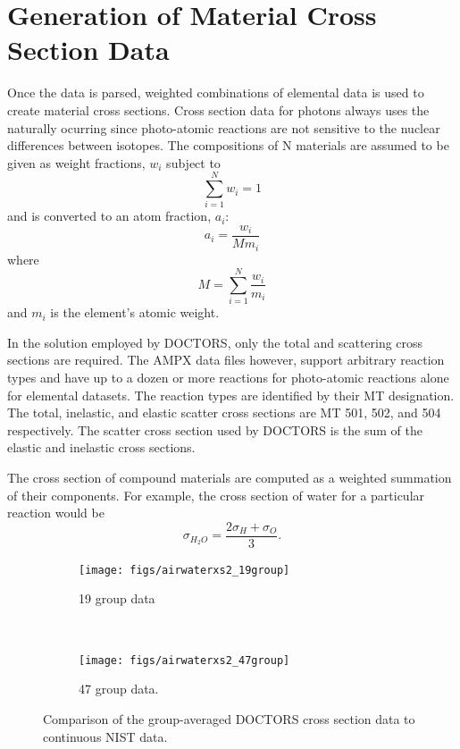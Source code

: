 \section{Generation of Material Cross Section Data}\label{sec:xsgen}

Once the data is parsed, weighted combinations of elemental data is used to create material cross sections. Cross section data for photons always uses the naturally ocurring since photo-atomic reactions are not sensitive to the nuclear differences between isotopes. The compositions of N materials are assumed to be given as weight fractions, $w_i$ subject to
\begin{equation}
\sum_{i = 1}^N w_i = 1
\end{equation}
and is converted to an atom fraction, $a_i$:
\begin{equation}
a_i = \frac{w_i}{M m_i}
\end{equation}
where
\begin{equation}
M = \sum_{i = 1}^N \frac{w_i}{m_i}
\end{equation}
and $m_i$ is the element's atomic weight.

In the solution employed by DOCTORS, only the total and scattering cross sections are required. The AMPX data files however, support arbitrary reaction types and have up to a dozen or more reactions for photo-atomic reactions alone for elemental datasets. The reaction types are identified by their MT designation. The total, inelastic, and elastic scatter cross sections are MT 501, 502, and 504 respectively. The scatter cross section used by DOCTORS is the sum of the elastic and inelastic cross sections.

The cross section of compound materials are computed as a weighted summation of their components. For example, the cross section of water for a particular reaction would be
\begin{equation}
\sigma_{H_2 O} = \frac{2 \sigma_H + \sigma_O}{3}.
\end{equation}

\begin{figure}
    \centering
    \begin{subfigure}[b]{0.45\textwidth}
        \texttt{[image: figs/airwaterxs2\_19group]}
        \caption{19 group data}
        \label{fig:airwaterxs2_19group}
    \end{subfigure}
    ~
    \begin{subfigure}[b]{0.45\textwidth}
        \texttt{[image: figs/airwaterxs2\_47group]}
        \caption{47 group data.}
        \label{fig:airwaterxs2_47group}
    \end{subfigure}
    \caption{Comparison of the group-averaged DOCTORS cross section data to continuous NIST data.}\label{fig:airwaterxs_group}
\end{figure}

